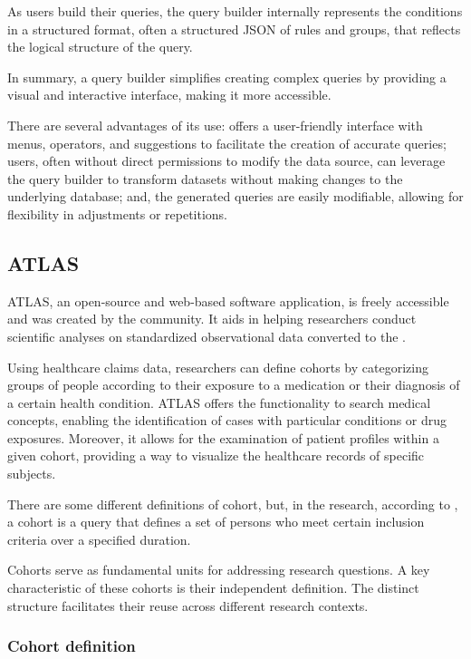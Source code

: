 As users build their queries, the query builder internally represents the conditions in a structured format, often a structured JSON of rules and groups, that reflects the logical structure of the query.

In summary, a query builder simplifies creating complex queries by providing a visual and interactive interface, making it more accessible.

There are several advantages of its use: offers a user-friendly interface with menus, operators, and suggestions to facilitate the creation of accurate queries; users, often without direct permissions to modify the data source, can leverage the query builder to transform datasets without making changes to the underlying database; and, the generated queries are easily modifiable, allowing for flexibility in adjustments or repetitions.


\subsection{ATLAS}


ATLAS, an open-source and web-based software application, is freely accessible and was created by the {\ohdsi} community. It aids in helping researchers conduct scientific analyses on standardized observational data converted to the {\omop}.

Using healthcare claims data, researchers can define cohorts by categorizing groups of people according to their exposure to a medication or their diagnosis of a certain health condition. ATLAS offers the functionality to search medical concepts, enabling the identification of cases with particular conditions or drug exposures. Moreover, it allows for the examination of patient profiles within a given cohort, providing a way to visualize the healthcare records of specific subjects.

There are some different definitions of cohort, but, in the {\ohdsi} research, according to \citet{informatics_chapter_nodate}, a cohort is a query that defines a set of persons who meet certain inclusion criteria over a specified duration.

Cohorts serve as fundamental units for addressing research questions. A key characteristic of these cohorts is their independent definition. The distinct structure facilitates their reuse across different research contexts.


\subsubsection{Cohort definition}

